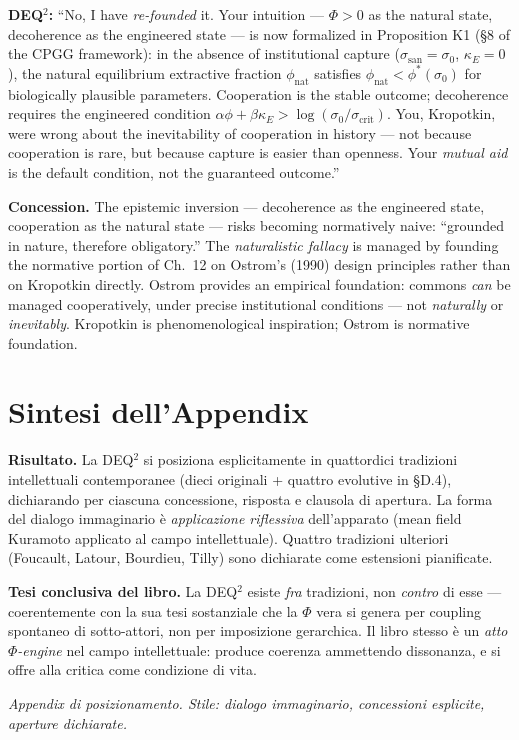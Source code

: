 \textbf{DEQ$^2$:} ``No, I have \emph{re-founded} it. Your intuition ---
$\Phi > 0$ as the natural state, decoherence as the engineered state ---
is now formalized in Proposition K1 (§8 of the CPGG framework): in the
absence of institutional capture ($\sigma_{\text{san}} = \sigma_0$,
$\kappa_E = 0$), the natural equilibrium extractive fraction
$\phi_{\text{nat}}$ satisfies $\phi_{\text{nat}} < \phi^*(\sigma_0)$ for
biologically plausible parameters. Cooperation is the stable outcome;
decoherence requires the engineered condition $\alpha\phi + \beta\kappa_E
> \log(\sigma_0/\sigma_{\text{crit}})$. You, Kropotkin, were wrong about
the inevitability of cooperation in history --- not because cooperation is
rare, but because capture is easier than openness. Your \emph{mutual
aid} is the default condition, not the guaranteed outcome.''

\textbf{Concession.} The epistemic inversion --- decoherence as the
engineered state, cooperation as the natural state --- risks becoming
normatively naive: ``grounded in nature, therefore obligatory.'' The
\emph{naturalistic fallacy} is managed by founding the normative portion
of Ch.~12 on Ostrom's (1990) design principles rather than on Kropotkin
directly. Ostrom provides an empirical foundation: commons \emph{can} be
managed cooperatively, under precise institutional conditions --- not
\emph{naturally} or \emph{inevitably}. Kropotkin is phenomenological
inspiration; Ostrom is normative foundation.



\section{Sintesi dell'Appendix}\label{sintesi-dellappendix}

\Proved{} \textbf{Risultato.} La DEQ$^2$ si posiziona esplicitamente in
quattordici tradizioni intellettuali contemporanee (dieci originali +
quattro evolutive in §D.4), dichiarando per ciascuna concessione, risposta
e clausola di apertura. La forma del dialogo immaginario è
\emph{applicazione riflessiva} dell'apparato (mean field Kuramoto
applicato al campo intellettuale). Quattro tradizioni ulteriori (Foucault,
Latour, Bourdieu, Tilly) sono dichiarate come estensioni pianificate.

\Hypoth{} \textbf{Tesi conclusiva del libro.} La DEQ$^2$ esiste \emph{fra}
tradizioni, non \emph{contro} di esse --- coerentemente con la sua tesi
sostanziale che la \(\Phi\) vera si genera per coupling spontaneo
di sotto-attori, non per imposizione gerarchica. Il libro stesso è un
\emph{atto \(\Phi\)-engine} nel campo intellettuale: produce coerenza
ammettendo dissonanza, e si offre alla critica come condizione di vita.



\emph{Appendix di posizionamento. Stile: dialogo immaginario,
concessioni esplicite, aperture dichiarate.}
